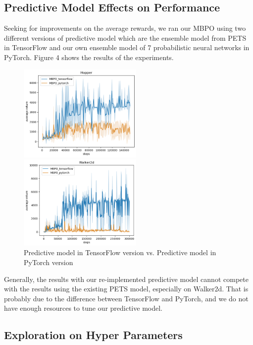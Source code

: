 \documentclass{article}
\begin{document}
\subsection{Predictive Model Effects on Performance}

Seeking for improvements on the average rewards, we ran our MBPO using two different versions of predictive model which are the ensemble model from PETS in TensorFlow and our own ensemble model of 7 probabilistic neural networks in PyTorch. Figure 4 shows the results of the experiments.

\begin{figure}[h]
\centering
\begin{minipage}[t]{0.48\textwidth}
\centering
\includegraphics[width=6cm]{tfVSpyHopper.png}
\end{minipage}
\begin{minipage}[t]{0.48\textwidth}
\centering
\includegraphics[width=6cm]{tfVSpyWalker2d.png}
\end{minipage}
\caption{Predictive model in TensorFlow version vs. Predictive model in PyTorch version}
\end{figure}

Generally, the results with our re-implemented predictive model cannot compete with the results using the existing PETS model, especially on Walker2d. That is probably due to the difference between TensorFlow and PyTorch, and we do not have enough resources to tune our predictive model.

\subsection{Exploration on Hyper Parameters}
\end{document}
